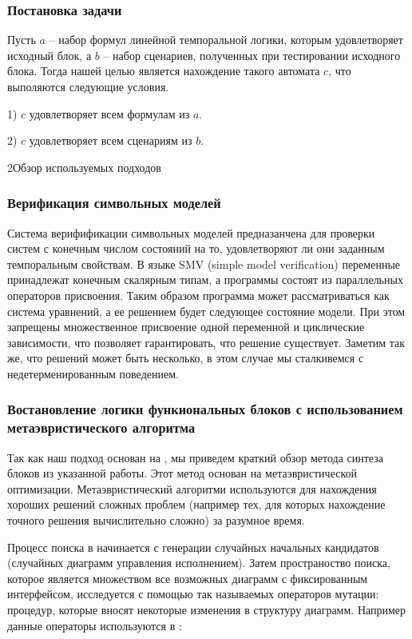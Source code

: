\documentclass[14pt]{extarticle}
\makeatletter
\theoremstyle{plain}
\theoremstyle{definition}
\renewcommand{\subsection}{\@startsection{subsection}{2}{0mm}%
{2\baselineskip}{\baselineskip}{\bfseries\large\itshape}}
\makeatother
\begin{document}
\subsubsection{Постановка задачи}

Пусть $a$ -- набор формул линейной темпоральной логики, которым удовлетворяет
исходный блок, а $b$ -- набор сценариев, полученных при тестировании исходного
блока. Тогда нашей целью является нахождение такого автомата $c$, что
выполяются следующие условия.

1) $c$ удовлетворяет всем формулам из $a$.

2) $c$ удовлетворяет всем сценариям из $b$.

\subsection{Обзор используемых подходов}
\subsubsection{Верификация символьных моделей}

Система верифификации символьных моделей предназанчена для проверки систем с
конечным числом состояний на то, удовлетворяют ли они заданным темпоральным
свойствам. В языке SMV (simple model verification) переменные принадлежат конечным скалярным типам, а
программы состоят из параллельных операторов присвоения. Таким образом
программа может рассматриваться как система уравнений, а ее решением будет
следующее состояние модели. При этом запрещены множественное присвоение одной
переменной и циклические зависимости, что позволяет гарантировать, что решение
существует. Заметим так же, что решений может быть несколько, в этом случае мы
сталкивемся с недетерменированным поведением.

\subsubsection{Востановление логики функиональных блоков с использованием
метаэвристического алгоритма}

Так как наш подход основан на \cite{rec}, мы приведем краткий обзор метода синтеза
блоков из указанной работы. Этот метод основан на метаэвристической
оптимизации. Метаэвристический алгоритми используются для нахождения хороших
решений сложных проблем (например тех, для которых нахождение точного решения
вычислительно сложно) за разумное время.

Процесс поиска в \cite{rec} начинается с генерации случайных начальных кандидатов
(случайных диаграмм управления исполнением). Затем пространоство поиска,
которое является множеством все возможных диаграмм с фиксированным интерфейсом,
исследуется с помощью так называемых операторов мутации: процедур, которые
вносят некоторые изменения в структуру диаграмм. Например данные операторы
используются в \cite{rec}:
\end{document}
